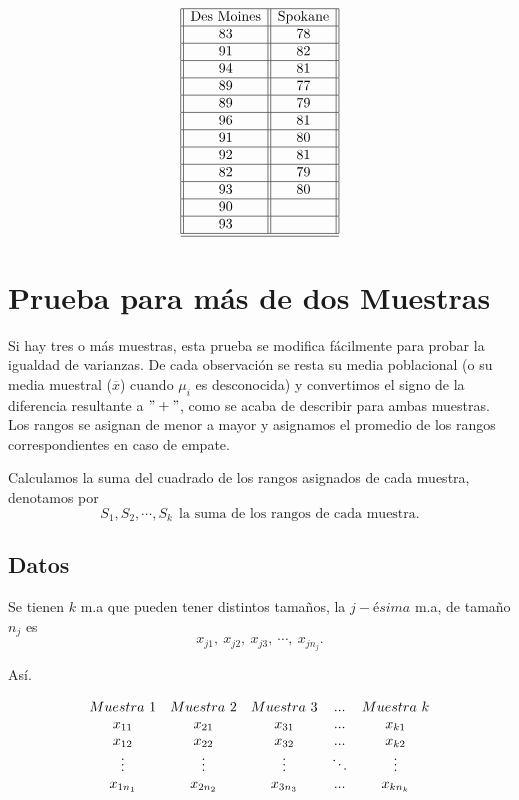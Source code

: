 \documentclass[
  a4paper,
  oneside,
  openany]{book}
\begin{document}
\[
\begin{array}{||c| |c||} 
\hline 
\mbox{Des Moines}& \mbox{Spokane} \\ 
 \hline
83&78\\
 \hline
91&82\\
 \hline
94&81\\
 \hline
89&77\\
 \hline
89&79\\
 \hline
96&81\\
 \hline
91&80\\
 \hline
92&81\\
 \hline
82&79\\
 \hline
93&80\\
 \hline
90&\\
 \hline
93&\\
 \hline
\hline
\end{array}
\]

\hypertarget{prueba-para-muxe1s-de-dos-muestras}{%
\chapter{Prueba para más de dos Muestras}\label{prueba-para-muxe1s-de-dos-muestras}}

Si hay tres o más muestras, esta prueba se modifica fácilmente para probar la igualdad de varianzas. De cada observación se resta su media poblacional (o su media muestral (\(\overline{x}\)) cuando \(\mu_{i}\) es desconocida) y convertimos el signo de la diferencia resultante a \("+"\), como se acaba de describir para ambas muestras.
Los rangos se asignan de menor a mayor y asignamos el promedio de los rangos correspondientes en caso de empate.

Calculamos la suma del cuadrado de los rangos asignados de cada muestra, denotamos por \[S_{1},S_{2},\cdots,S_{k} \  \ \mbox{la suma de los rangos de cada muestra.}\]

\hypertarget{datos-9}{%
\section{Datos}\label{datos-9}}

Se tienen \(k\) m.a que pueden tener distintos tamaños, la \(j-ésima\) m.a, de tamaño \(n_j\) es \[x_{j1},\ x_{j2},\ x_{j3},\ \cdots, \ x_{jn_j}.\]

Así.

\[
\begin{array}{c c c c c} 
Muestra \ 1&Muestra\ 2&Muestra\ 3&...& Muestra\ k \\
x_{11}&x_{21}&x_{31}&...&x_{k1}\\
x_{12}&x_{22}&x_{32}&...&x_{k2}\\
\vdots&\vdots&\vdots&\ddots&\vdots\\
x_{1n_1}&x_{2n_2}&x_{3n_3}&...&x_{kn_k}\\
\end{array}
\]
\end{document}
